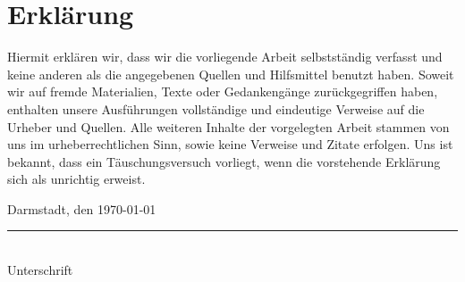 \documentclass[10pt]{report}
\begin{document}
\section*{Erkl\"arung}
\thispagestyle{empty}

Hiermit erkl{\"a}ren wir, dass wir die vorliegende Arbeit selbstst{\"a}ndig verfasst und keine anderen als die angegebenen Quellen und Hilfsmittel benutzt haben. Soweit wir auf fremde Materialien, Texte oder Gedankeng{\"a}nge zur{\"u}ckgegriffen haben, enthalten unsere Ausf{\"u}hrungen vollst{\"a}ndige und eindeutige Verweise auf die Urheber und Quellen. Alle weiteren Inhalte der vorgelegten Arbeit stammen von uns im urheberrechtlichen Sinn, sowie keine Verweise und Zitate erfolgen. Uns ist bekannt, dass ein T{\"a}uschungsversuch vorliegt, wenn die vorstehende Erkl{\"a}rung sich als unrichtig erweist.\\[1.5cm]
\parbox{0.5\textwidth}{Darmstadt, den \today}%
\parbox{0.5\textwidth}{
\begin{center}
\rule{0.5\textwidth}{0.5pt} \\
Unterschrift


\end{center}
}
\end{document}
